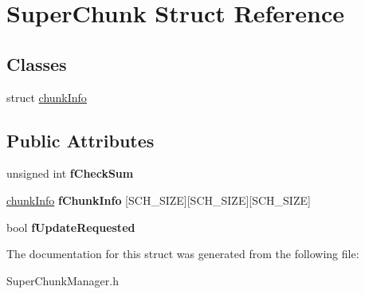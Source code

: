 \hypertarget{structSuperChunk}{\section{\-Super\-Chunk \-Struct \-Reference}
\label{structSuperChunk}
}
\subsection*{\-Classes}
\begin{DoxyCompactItemize}
\item 
struct \hyperlink{structSuperChunk_1_1chunkInfo}{chunk\-Info}
\end{DoxyCompactItemize}
\subsection*{\-Public \-Attributes}
\begin{DoxyCompactItemize}
\item 
\hypertarget{structSuperChunk_a4a559a2e7b8f19b4c284a61818736306}{unsigned int {\bfseries f\-Check\-Sum}}\label{structSuperChunk_a4a559a2e7b8f19b4c284a61818736306}

\item 
\hypertarget{structSuperChunk_a11b5ad8b0b86192cd6966f8fab0974f5}{\hyperlink{structSuperChunk_1_1chunkInfo}{chunk\-Info} {\bfseries f\-Chunk\-Info} \mbox{[}\-S\-C\-H\-\_\-\-S\-I\-Z\-E\mbox{]}\mbox{[}\-S\-C\-H\-\_\-\-S\-I\-Z\-E\mbox{]}\mbox{[}\-S\-C\-H\-\_\-\-S\-I\-Z\-E\mbox{]}}\label{structSuperChunk_a11b5ad8b0b86192cd6966f8fab0974f5}

\item 
\hypertarget{structSuperChunk_ad4ba3e96b0ec2674bcc613f309e1b4aa}{bool {\bfseries f\-Update\-Requested}}\label{structSuperChunk_ad4ba3e96b0ec2674bcc613f309e1b4aa}

\end{DoxyCompactItemize}


\-The documentation for this struct was generated from the following file\-:\begin{DoxyCompactItemize}
\item 
\-Super\-Chunk\-Manager.\-h\end{DoxyCompactItemize}
